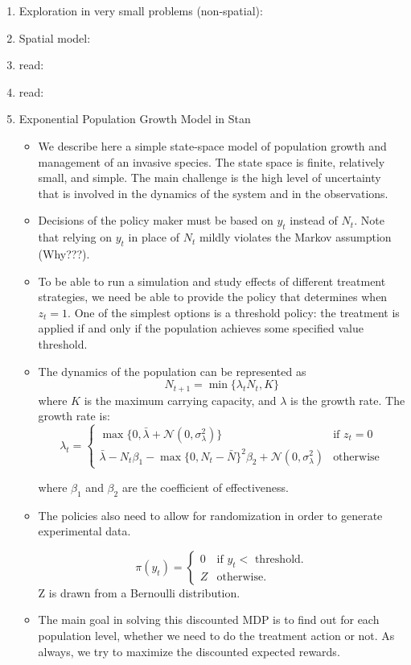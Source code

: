 \documentclass{article}
\theoremstyle{remark}
\theoremstyle{remark}
\theoremstyle{remark}
\theoremstyle{remark}
\theoremstyle{remark}
\theoremstyle{remark}
\newcommand{\marek}[1]{\textcolor{Bittersweet}{#1}}
\begin{document}
\begin{enumerate}
\begin{itemize}
	\end{itemize}
	\item Exploration in very small problems (non-spatial): \cite{Hall2018,Taleghan2015}
	\item Spatial model: \cite{Nicol2017}
	\item \marek{read}: \cite{Albers2018}
	\item \marek{read}: \cite{Mehta2007}
	\item Exponential Population Growth Model in Stan
	\begin{itemize}
		\item We describe here a simple state-space model of population growth and management of an invasive species. The state space is finite, relatively small, and simple. The main challenge is the high level of uncertainty that is involved in the dynamics of the system and in the observations.
		\item Decisions of the policy maker must be based on $y_t$ instead of $N_t$. Note that relying on $y_t$ in place of $N_t$ mildly violates the Markov assumption (Why???).
		\item To be able to run a simulation and study effects of different treatment strategies, we need be able to provide the policy that determines when $z_t=1$. One of the simplest options is a threshold policy: the treatment is applied if and only if the population achieves some specified value threshold.
		\item The dynamics of the population can be represented as
		$$ N_{t+1} = \min \{\lambda_t N_t, K \} $$
		where $K$ is the maximum carrying capacity, and $\lambda$ is the growth rate. The growth rate is:
		\begin{equation}
		\lambda_t = \begin{cases}
				\max \{ 0, \bar{\lambda} + \mathcal{N}(0, \sigma_\lambda^2) \} & \text{if $z_t = 0 $} \\
				\bar{\lambda} - N_t \beta_1 - \max \{ 0, N_t - \bar{N}\}^2\beta_2 + \mathcal{N}(0, \sigma_\lambda^2) & \text{otherwise}
			\end{cases}
		\end{equation}

		where $\beta_1$ and $\beta_2$ are the coefficient of effectiveness.
		\item The policies also need to allow for randomization in order to generate experimental data.

		\begin{equation}
		  \pi(y_t)=\begin{cases}
		    0 & \text{if $y_t <$  threshold}.\\
		    Z & \text{otherwise}.
		  \end{cases}
		\end{equation}
		Z is drawn from a Bernoulli distribution.
		\item The main goal in solving this discounted MDP is to find out for each population level, whether we need to do the treatment action or not. As always, we try to maximize the discounted expected rewards.



	\end{itemize}
\end{enumerate}
\end{document}
